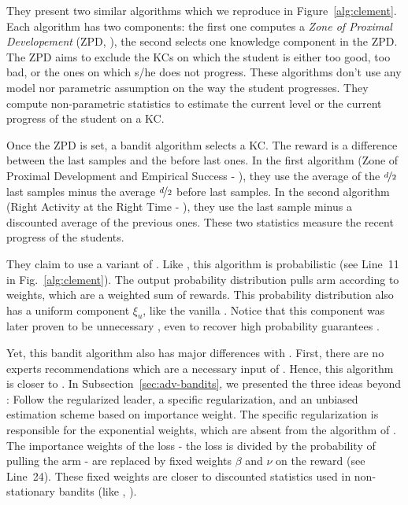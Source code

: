 They present two similar algorithms which we reproduce in Figure~\ref{alg:clement}. Each algorithm has two components: the first one computes a \emph{Zone of Proximal Developement} (ZPD, \citet{luckin2001designing}), the second selects one knowledge component in the ZPD. The ZPD aims to exclude the KCs on which the student is either too good, too bad, or the ones on which s/he does not progress.  These algorithms don't use any model nor parametric assumption on the way the student progresses. They compute non-parametric statistics to estimate the current level or the current progress of the student on a KC.

Once the ZPD is set, a bandit algorithm selects a KC. The reward is a difference between the last samples and the before last ones. In the first algorithm (Zone of Proximal Development and Empirical Success - \ZPDES), they use the average of the $\nicefrac{d}{2}$ last samples minus the average $\nicefrac{d}{2}$ before last samples. In the second algorithm (Right Activity at the Right Time - \RiARiT), they use the last sample minus a discounted average of the previous ones. These two statistics measure the recent progress of the students. 

They claim to use a variant of \EXPfour \citep{auer2002nonstochastic}. Like \EXPfour, this algorithm is probabilistic (see Line~11 in Fig.~\ref{alg:clement}). The output probability distribution pulls arm according to weights, which are a weighted sum of rewards. This probability distribution also has a uniform component $\xi_u$, like the vanilla \EXPfour. Notice that this component was later proven to be unnecessary \citep{bubeck2012regret}, even to recover high probability guarantees \citep{neu2015explore}. 

Yet, this bandit algorithm also has major differences with \EXPfour. First, there are no experts recommendations which are a necessary input of \EXPfour. Hence, this algorithm is closer to \EXP. In Subsection~\ref{sec:adv-bandits}, we presented the three ideas beyond \EXP: Follow the regularized leader, a specific regularization, and an unbiased estimation scheme based on importance weight. The specific regularization is responsible for the exponential weights, which are absent from the algorithm of \citet{clement2015multi}. The importance weights of the loss -  the loss is divided by the probability of pulling the arm - are replaced by fixed weights $\beta$ and $\nu$ on the reward (see Line~24). These fixed weights are closer to discounted statistics used in non-stationary bandits (like \DUCB, \citet{kocsis2006discounted, garivier2011upper-confidence-bound}). 

